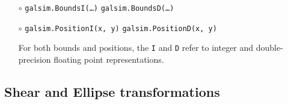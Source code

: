 \documentclass[preprint,11pt]{../../devel/modules/aastex}
\begin{document}
\begin{itemize}

\item[$\circ$] \texttt{galsim.BoundsI(\dots)} \newline
  \texttt{galsim.BoundsD(\dots)} 

\item[$\circ$] \texttt{galsim.PositionI(x, y)} \newline
  \texttt{galsim.PositionD(x, y)} 

For both bounds and positions, the \texttt{I} and \texttt{D} refer to
integer and double-precision floating point representations.

\end{itemize}

\subsection{Shear and Ellipse transformations}\label{sect:shears}
\end{document}

